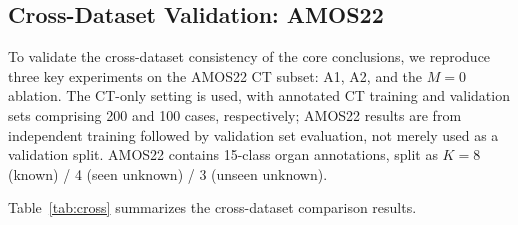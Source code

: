 \documentclass[3p,twocolumn,authoryear]{elsarticle}
\begin{document}
\subsection{Cross-Dataset Validation: AMOS22}\label{sec:exp:cross}

To validate the cross-dataset consistency of the core conclusions, we reproduce three
key experiments on the AMOS22 CT subset: A1, A2, and the $M=0$ ablation.
The CT-only setting is used, with annotated CT training and validation sets comprising
200 and 100 cases, respectively; AMOS22 results are from independent training followed
by validation set evaluation, not merely used as a validation split.
AMOS22 contains 15-class organ annotations, split as $K=8$ (known) / 4 (seen unknown) /
3 (unseen unknown).

Table~\ref{tab:cross} summarizes the cross-dataset comparison results.

\begin{table}[!t]
\centering
\caption{Cross-dataset comparison between Synapse and AMOS22.
All three core conclusions are consistent across both independent datasets.
`\texttt{---}' indicates the metric is not applicable or not reported for that setting.}\label{tab:cross}
\footnotesize
{}
\end{table}
\end{document}
